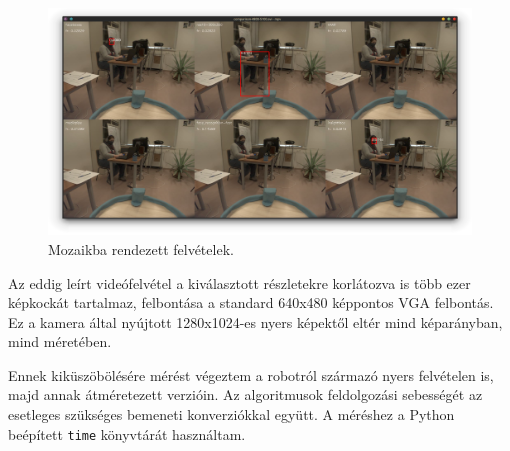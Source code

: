 \begin{figure}
    \centering
    \includegraphics[width=\linewidth]{figures/video_comparison/video_comparison_mosaic.png}
    \caption{Mozaikba rendezett felvételek.}
    \label{fig::video_mosaic}
\end{figure}

Az eddig leírt videófelvétel a kiválasztott részletekre korlátozva is több ezer képkockát tartalmaz, felbontása a standard 640x480 képpontos VGA felbontás. Ez a kamera által nyújtott 1280x1024-es nyers képektől eltér mind képarányban, mind méretében.

Ennek kiküszöbölésére mérést végeztem a robotról származó nyers felvételen is, majd annak átméretezett verzióin. Az algoritmusok feldolgozási sebességét az esetleges szükséges bemeneti konverziókkal együtt. A méréshez a Python beépített \lstinline{time} könyvtárát használtam.

